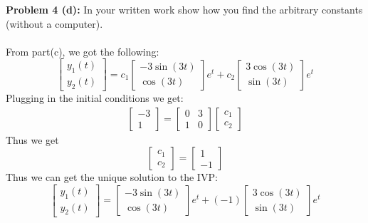 \documentclass[12pt]{article}
\begin{document}
\noindent \textbf{Problem 4 (d): }In your written work show how you find the arbitrary constants (without a computer).
\\ \\
From part(c), we got the following:
$$
\begin{bmatrix} y_1(t) \\ y_2(t) \end{bmatrix} =
c_1 \begin{bmatrix}
-3\sin(3t) \\
\cos(3t)
\end{bmatrix}e^t +
c_2 \begin{bmatrix}
3\cos(3t) \\
\sin(3t)
\end{bmatrix}e^t
$$
Plugging in the initial conditions we get:
\begin{align*}
\begin{bmatrix} -3 \\ 1 \end{bmatrix} =
\begin{bmatrix}	0  & 3 \\ 1 & 0	\end{bmatrix}
\begin{bmatrix}	c_1 \\ c_2	\end{bmatrix}
\end{align*}
Thus we get
$$
\begin{bmatrix}	c_1 \\ c_2	\end{bmatrix} = \begin{bmatrix}	1 \\ -1	\end{bmatrix}
$$
Thus we can get the unique solution to the IVP:
$$
\begin{bmatrix} y_1(t) \\ y_2(t) \end{bmatrix} =
\begin{bmatrix}
-3\sin(3t) \\
\cos(3t)
\end{bmatrix}e^t +
(-1)\begin{bmatrix}
3\cos(3t) \\
\sin(3t)
\end{bmatrix}e^t
$$

\vspace{\baselineskip}
\vspace{\baselineskip}
\vspace{\baselineskip}
\end{document}
